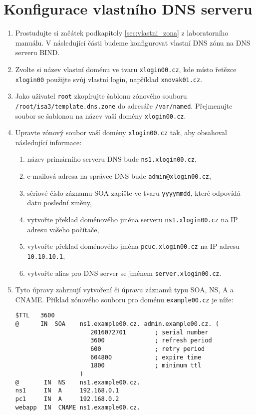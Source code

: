 \documentclass[a4paper,11pt]{article}
\begin{document}
\section{Konfigurace vlastního DNS serveru}
\begin{enumerate}
  \item Prostudujte si začátek podkapitoly \ref{sec:vlastni_zona} z laboratorního manuálu. V následující části budeme konfigurovat vlastní DNS zónu na DNS serveru BIND.
  \item Zvolte si název vlastní doménu ve tvaru {\tt xlogin00.cz}, kde místo řetězce {\tt xlogin00} použijte svůj vlastní login, například {\tt xnovak01.cz}. 

  \item Jako uživatel {\tt root} zkopírujte šablonu zónového souboru {\tt /root/isa3/template.dns.zone} do adresáře {\tt /var/named}. Přejmenujte soubor se šablonou na název vaší domény {\tt xlogin00.cz}.
  \item Upravte zónový soubor vaší domény {\tt xlogin00.cz} tak, aby obsahoval následující informace:
    \begin{enumerate}
      \item název primárního serveru DNS bude  {\tt ns1.xlogin00.cz},
      \item e-mailová adresa na správce DNS bude {\tt admin@xlogin00.cz},
      \item sériové číslo záznamu SOA zapište ve tvaru {\tt yyyymmdd}, které odpovídá datu poslední změny, 
      \item vytvořte překlad doménového jména serveru {\tt ns1.xlogin00.cz} na IP adresu vašeho počítače, 
      \item vytvořte překlad doménového jména {\tt pcuc.xlogin00.cz} na IP adresu {\tt 10.10.10.1},
      \item vytvořte alias pro DNS server se jménem {\tt server.xlogin00.cz}. 
    \end{enumerate}
  \item Tyto úpravy zahrnují vytvoření či úpravu záznamů typu SOA, NS, A a CNAME. Příklad zónového souboru pro doménu {\tt example00.cz} je níže:
\begin{verbatim}
$TTL   3600
@      IN  SOA    ns1.example00.cz. admin.example00.cz. (
                     2016072701        ; serial number
                     3600              ; refresh period
                     600               ; retry period
                     604800            ; expire time
                     1800              ; minimum ttl
                  )
@       IN  NS    ns1.example00.cz.
ns1     IN  A     192.168.0.1
pc1     IN  A     192.168.0.2
webapp  IN  CNAME ns1.example00.cz.
\end{verbatim}
  

\end{enumerate}
\end{document}
